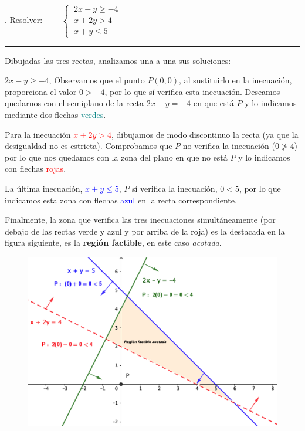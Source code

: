 \vspace{5mm}
\begin{example}
. 	Resolver: $\qquad \begin{cases}
\ 2x-y\ge -4 \\ \ x+2y>4 \\ \ x+y \le 5	
\end{cases}	$

\vspace{3mm}
\rule{150pt}{0.1pt}
\vspace{3mm}

Dibujadas las tres rectas, analizamos una a una sus soluciones:

\vspace{2mm} $2x-y\ge -4$, Observamos que el punto $P(0,0)$, al sustituirlo en la inecuación, proporciona el valor $0>-4$, por lo que sí verifica esta inecuación. Deseamos quedarnos con el semiplano de la recta $2x-y=-4$ en que está $P$ y lo indicamos mediante dos flechas \textcolor{teal}{verdes}.

\vspace{2mm} Para la inecuación \textcolor{red}{$x+2y>4$}, dibujamos de modo discontinuo la recta (ya que la desigualdad no es estricta). Comprobamos que $P$ no verifica la inecuación ($0 \ngtr 4$) por lo que nos quedamos con la zona del plano en que no está $P$ y lo indicamos con flechas \textcolor{red}{rojas}.

\vspace{2mm} La última inecuación, \textcolor{blue}{$x+y\le 5$}, $P$ sí verifica la inecuación, $0<5$, por lo que indicamos esta zona con flechas \textcolor{blue}{azul} en la recta correspondiente.

\vspace{4mm} Finalmente, la zona que verifica las tres inecuaciones simultáneamente (por debajo de las rectas verde y azul y por arriba de la roja) es la destacada en la figura siguiente, es la \textbf{región factible}, en este caso  \emph{acotada}.

\end{example}

\vspace{5mm}
\begin{figure}[h]
	\centering
	\includegraphics[width=.9\textwidth]{imagenes/img08.png}
\end{figure}

